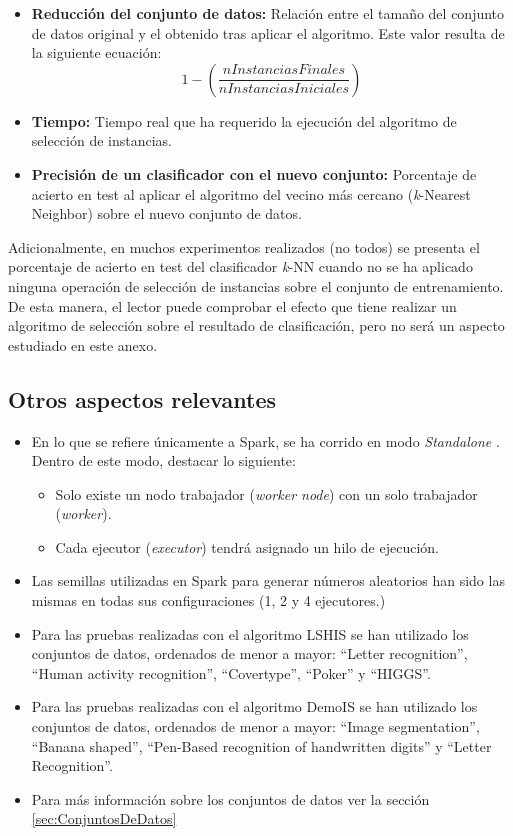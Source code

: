 \begin{itemize}
	\item \textbf{Reducción del conjunto de datos:} Relación entre el tamaño del conjunto de datos original y el obtenido tras aplicar el algoritmo. Este valor resulta de la siguiente ecuación: \[1-\left(\frac{nInstanciasFinales}{nInstanciasIniciales} \right)\]

	\item \textbf{Tiempo:} Tiempo real que ha requerido la ejecución del algoritmo de selección de instancias.
	\item \textbf{Precisión de un clasificador con el nuevo conjunto:} Porcentaje de acierto en test al aplicar el algoritmo del vecino más cercano (\textit{k}-Nearest Neighbor) sobre el nuevo conjunto de datos.
\end{itemize}

Adicionalmente, en muchos experimentos realizados (no todos) se presenta el porcentaje de acierto en test del clasificador \textit{k}-NN cuando no se ha aplicado ninguna operación de selección de instancias sobre el conjunto de entrenamiento. De esta manera, el lector puede comprobar el efecto que tiene realizar un algoritmo de selección sobre el resultado de clasificación, pero no será un aspecto estudiado en este anexo.

\subsection{Otros aspectos relevantes}\label{subsec:otrosLSHISyDemoIS}
 \begin{itemize}
	\item En lo que se refiere únicamente a Spark, se ha corrido en modo \textit{Standalone} \cite{StandaloneSpark}. Dentro de este modo, destacar lo siguiente:
	\begin{itemize}
		\item Solo existe un nodo trabajador (\textit{worker node}) con un solo trabajador (\textit{worker}).
		\item Cada ejecutor (\textit{executor}) tendrá asignado un hilo de ejecución.
	\end{itemize}
	\item Las semillas utilizadas en Spark para generar números aleatorios han sido las mismas en todas sus configuraciones (1, 2 y 4 ejecutores.)
	\item Para las pruebas realizadas con el algoritmo LSHIS se han utilizado los conjuntos de datos, ordenados de menor a mayor: ``Letter recognition'', ``Human activity recognition'', ``Covertype'', ``Poker'' y ``HIGGS''.
	\item Para las pruebas realizadas con el algoritmo DemoIS se han utilizado los conjuntos de datos, ordenados de menor a mayor:  ``Image segmentation'', ``Banana shaped'', ``Pen-Based recognition of handwritten digits'' y ``Letter Recognition''.
	\item Para más información sobre los conjuntos de datos ver la sección \ref{sec:ConjuntosDeDatos}
 \end{itemize}


